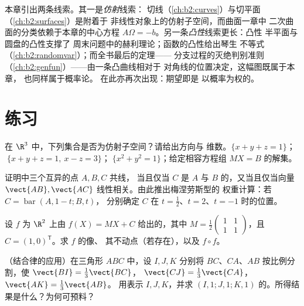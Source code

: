 \begin{remark}[本册内的展望]
本章引出两条线索。其一是\emph{仿射}线索：
切线（\cref{ch:b2:curves}）与切平面
（\cref{ch:b2:surfaces}）是附着于
非线性对象上的仿射子空间，而曲面一章中
二次曲面的分类依赖于本章的中心方程
$A\Omega = -b$。另一条\emph{凸性}线索更长：凸性
半平面与圆盘的凸性支撑了
周末问题中的赫利理论；函数的凸性给出琴生
不等式（\cref{ch:b2:randomvar}）；而全书最后的定理——
分支过程的灭绝判别准则
（\cref{ch:b2:genfun}）——由一条凸曲线相对于
对角线的位置决定，这幅图既属于本章，
也同样属于概率论。
在此亦再次出现：期望即是
以概率为权的。
\end{remark}

\section{练习}

\begin{exercise}[$\star$]\label{exo:b2:affine:1}
在 $\R^3$ 中，下列集合是否为仿射子空间？请给出方向与
维数。$\{x + y + z = 1\}$；$\;\{x + y + z = 1,\ x - z =
3\}$；$\;\{x^2 + y^2 = 1\}$；给定相容方程组
$MX = B$ 的解集。
\end{exercise}

\begin{exercise}[$\star$]\label{exo:b2:affine:2}
证明中三个互异的点 $A, B, C$ 共线，
当且仅当 $C$ 是 $A$ 与 $B$ 的，又当且仅当向量
$\vect{AB}, \vect{AC}$ 线性相关。由此推出梅涅劳斯型的
权重计算：若 $C = \operatorname{bar}(A, 1 - t; B, t)$，
分别确定 $C$ 在 $t = \frac12$、$t = 2$、$t = -1$ 时的位置。
\end{exercise}

\begin{exercise}[$\star$]\label{exo:b2:affine:3}
设 $f$ 为 $\R^2$ 上由 $f(X) = MX + C$ 给出的，其中
$M = \frac12\begin{pmatrix} 1 & 1\\ 1 & 1\end{pmatrix}$，且 $C =
(1, 0)^{\mathsf T}$。求 $f$ 的像、
其不动点（若存在），以及 $f \circ f$。
\end{exercise}

\begin{exercise}[$\star\star$]\label{exo:b2:affine:4}
（结合律的应用）在三角形 $ABC$ 中，设 $I, J, K$ 分别将
$BC$、$CA$、$AB$ 按比例分割，使 $\vect{BI} = \frac13\vect{BC}$，
$\vect{CJ} = \frac13\vect{CA}$，$\vect{AK} = \frac13\vect{AB}$。
用表示 $I, J, K$，并求
$(I,1;J,1;K,1)$ 的。所得结果是什么？为何可预料？
\end{exercise}

